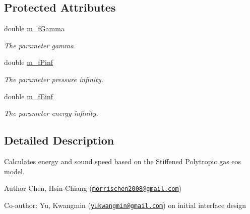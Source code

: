 \subsection*{Protected Attributes}
\begin{DoxyCompactItemize}
\item 
\hypertarget{classStiffPolytropicGasEOS_aa1f6ae6c1079aeabe3bd5427a4bc5103}{double \hyperlink{classStiffPolytropicGasEOS_aa1f6ae6c1079aeabe3bd5427a4bc5103}{m\-\_\-f\-Gamma}}\label{classStiffPolytropicGasEOS_aa1f6ae6c1079aeabe3bd5427a4bc5103}

\begin{DoxyCompactList}\small\item\em The parameter {\itshape gamma}. \end{DoxyCompactList}\item 
\hypertarget{classStiffPolytropicGasEOS_af0327487a5a9c41bbd35429914e5888e}{double \hyperlink{classStiffPolytropicGasEOS_af0327487a5a9c41bbd35429914e5888e}{m\-\_\-f\-Pinf}}\label{classStiffPolytropicGasEOS_af0327487a5a9c41bbd35429914e5888e}

\begin{DoxyCompactList}\small\item\em The parameter pressure infinity. \end{DoxyCompactList}\item 
\hypertarget{classStiffPolytropicGasEOS_aeed84ee623f3982d75e94ee0e9b3010b}{double \hyperlink{classStiffPolytropicGasEOS_aeed84ee623f3982d75e94ee0e9b3010b}{m\-\_\-f\-Einf}}\label{classStiffPolytropicGasEOS_aeed84ee623f3982d75e94ee0e9b3010b}

\begin{DoxyCompactList}\small\item\em The parameter energy infinity. \end{DoxyCompactList}\end{DoxyCompactItemize}


\subsection{Detailed Description}
Calculates energy and sound speed based on the Stiffened Polytropic gas eos model. 

\begin{DoxyAuthor}{Author}
Chen, Hsin-\/\-Chiang (\href{mailto:morrischen2008@gmail.com}{\tt morrischen2008@gmail.\-com})
\end{DoxyAuthor}
Co-\/author\-: Yu, Kwangmin (\href{mailto:yukwangmin@gmail.com}{\tt yukwangmin@gmail.\-com}) on initial interface design


